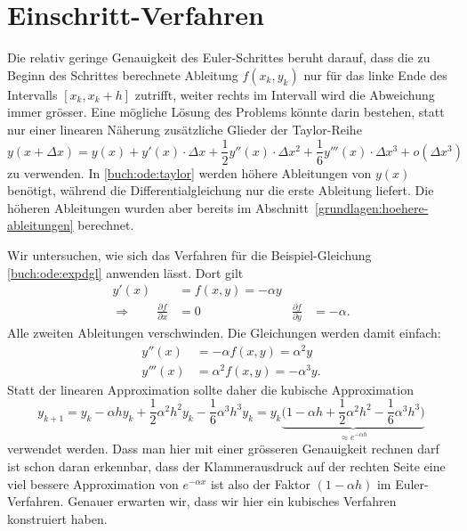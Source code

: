 %
%
%
\section{Einschritt-Verfahren\label{buch:section:ode:einschritt}}
Die relativ geringe Genauigkeit des Euler-Schrittes beruht darauf,
dass die zu Beginn des Schrittes berechnete Ableitung $f(x_k,y_k)$
nur für das linke Ende des Intervalls $[x_k, x_k+h]$ zutrifft,
weiter rechts im Intervall wird die Abweichung immer grösser.
Eine mögliche Lösung des Problems könnte darin bestehen, statt
nur einer linearen Näherung zusätzliche Glieder der Taylor-Reihe
\begin{equation}
y(x+\Delta x)
=
y(x)
+
y'(x)\cdot \Delta x
+
\frac12 y''(x)\cdot \Delta x^2
+
\frac16 y'''(x)\cdot \Delta x^3
+
o(\Delta x^3)
\label{buch:ode:taylor}
\end{equation}
zu verwenden.
In \eqref{buch:ode:taylor} werden höhere Ableitungen von $y(x)$ benötigt,
während die Differentialgleichung nur die erste Ableitung liefert.
Die höheren Ableitungen wurden aber bereits im
Abschnitt~\ref{grundlagen:hoehere-ableitungen} berechnet.

Wir untersuchen, wie sich das Verfahren für die Beispiel-Gleichung
\eqref{buch:ode:expdgl} anwenden lässt.
Dort gilt
\begin{equation*}
\begin{aligned}
y'(x)&=f(x,y)=-\alpha y
\\
\Rightarrow\qquad
\frac{\partial f}{\partial x}&=0&\frac{\partial f}{\partial y}&=-\alpha.
\end{aligned}
\end{equation*}
Alle zweiten Ableitungen verschwinden.
Die Gleichungen werden damit einfach:
\begin{align*}
y''(x)&=-\alpha f(x,y)=\alpha^2 y
\\
y'''(x)&=\alpha^2f(x,y)=-\alpha^3 y.
\end{align*}
Statt der linearen Approximation sollte daher die kubische Approximation
\begin{equation}
y_{k+1}
=
y_{k}-\alpha h y_k +\frac12\alpha^2 h^2 y_k -\frac16 \alpha^3h^3 y_k
=
y_{k}\underbrace{\biggl(1-\alpha h +\frac12\alpha^2h^2 -\frac16 \alpha^3h^3\biggr)}_{\displaystyle \approx e^{-\alpha h}}
\label{buch:ode:kubisch}
\end{equation}
verwendet werden.
Dass man hier mit einer grösseren Genauigkeit rechnen darf ist schon daran
erkennbar, dass der Klammerausdruck auf der rechten Seite eine viel
bessere Approximation von $e^{-\alpha x}$ ist also der Faktor
$(1-\alpha h)$ im Euler-Verfahren.
Genauer erwarten wir, dass wir hier ein kubisches Verfahren konstruiert haben.

